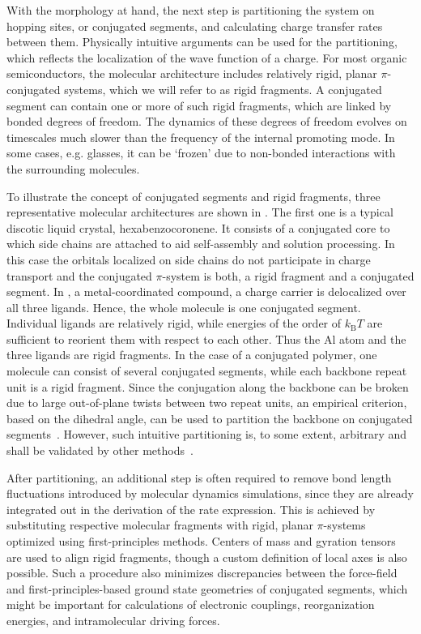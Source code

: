 With the morphology at hand, the next step is partitioning the system on hopping sites, or conjugated segments, and calculating charge transfer rates between them. Physically intuitive arguments can be used for the partitioning,  which reflects the localization of the wave function of a charge. For most organic semiconductors, the molecular architecture includes relatively rigid, planar $\pi$-conjugated systems, which we will refer to as rigid fragments. A conjugated segment can contain one or more of such rigid fragments, which are linked by bonded degrees of freedom. The dynamics of these degrees of freedom evolves on timescales much slower than the frequency of the internal promoting mode. In some cases, e.g. glasses, it can be `frozen' due to non-bonded interactions with the surrounding molecules.

To illustrate the concept of conjugated segments and rigid fragments, three representative molecular architectures are shown in . The first one is a typical discotic liquid crystal, hexabenzocoronene. It consists of a conjugated core to which side chains are attached to aid self-assembly and solution processing. In this case the orbitals localized on side chains do not participate in charge transport and the conjugated $\pi$-system is both, a rigid fragment and a conjugated segment. 
%
In \Alq, a metal-coordinated compound, a charge carrier is delocalized over all three ligands. Hence, the whole molecule is one conjugated segment. Individual ligands are relatively rigid, while energies of the order of $k_\text{B}T$ are sufficient to reorient them with respect to each other. Thus the Al atom and the three ligands are rigid fragments.
%
In the case of a conjugated polymer, one molecule can consist of several conjugated segments, while each backbone repeat unit is a rigid fragment. Since the conjugation along the backbone can be broken due to large out-of-plane twists between two repeat units, an empirical criterion, based on the dihedral angle, can be used to partition the backbone on conjugated segments~\cite{ruehle_multiscale_2010}. However, such intuitive partitioning is, to some extent, arbitrary and shall be validated by other methods~\cite{vukmirovi_charge_2008,vukmirovi_charge_2009,mcmahon_ad_2009}. 

After partitioning, an additional step is often required to remove bond length fluctuations introduced by molecular dynamics simulations, since they are already integrated out in the derivation of the rate expression. This is achieved by substituting respective molecular fragments with  rigid, planar $\pi$-systems optimized using first-principles methods. Centers of mass and gyration tensors are used to align rigid fragments, though a custom definition of local axes is also possible. Such a procedure also minimizes discrepancies between the force-field and first-principles-based ground state geometries of conjugated segments, which might be important for calculations of electronic couplings, reorganization energies, and intramolecular driving forces. 

